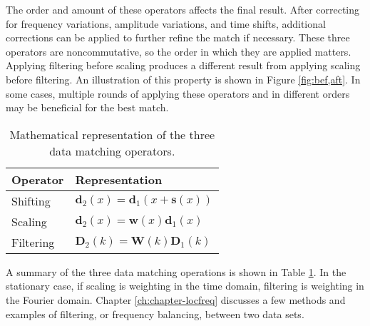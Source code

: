 The order and amount of these operators affects the final result.
After correcting for frequency variations, amplitude variations, and time shifts, additional corrections can be applied to further refine the match if necessary.
These three operators are noncommutative, so the order in which they are applied matters.
Applying filtering before scaling produces a different result from applying scaling before filtering. 
An illustration of this property is shown in Figure \ref{fig:bef,aft}.
In some cases, multiple rounds of applying these operators and in different orders may be beneficial for the best match.


\begin{table}[h]
\centering
\begin{tabular}{l|l}
\textbf{Operator} & \textbf{Representation} \\ \hline
        Shifting          & $\mathbf{d}_2(x) = \mathbf{d}_1(x + \mathbf{s}(x))$\\
        Scaling           & $\mathbf{d}_2(x) = \mathbf{w}(x)\mathbf{d}_1(x)$\\
        Filtering         & $\mathbf{D}_2(k) = \mathbf{W}(k)\mathbf{D}_1(k)$
\end{tabular}
\caption{Mathematical representation of the three data matching operators.}
\label{op}
\end{table}

A summary of the three data matching operations is shown in Table \ref{op}.
In the stationary case, if scaling is weighting in the time domain, filtering is weighting in the Fourier domain.
Chapter \ref{ch:chapter-locfreq} discusses a few methods and examples of filtering, or frequency balancing, between two data sets.
